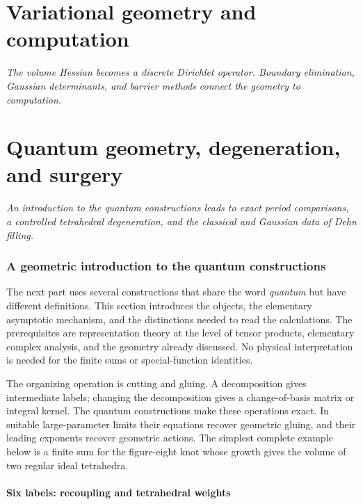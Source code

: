 \documentclass[11pt,a4paper]{article}
\newcommand{\monographpart}[2]{%
  \clearpage\part{#1}%
  \noindent\textit{#2}\par\medskip}
\numberwithin{equation}{section}
\theoremstyle{definition}
\theoremstyle{remark}
\begin{document}
\monographpart{Variational geometry and computation}{The volume Hessian becomes a discrete Dirichlet operator. Boundary elimination, Gaussian determinants, and barrier methods connect the geometry to computation.}


\monographpart{Quantum geometry, degeneration, and surgery}{An introduction to the quantum constructions leads to exact period comparisons, a controlled tetrahedral degeneration, and the classical and Gaussian data of Dehn filling.}

\section{A geometric introduction to the quantum constructions}
\label{sec:quantumintro}

The next part uses several constructions that share the word
\emph{quantum} but have different definitions. This section introduces
the objects, the elementary asymptotic mechanism, and the distinctions
needed to read the calculations. The prerequisites are representation
theory at the level of tensor products, elementary complex analysis,
and the geometry already discussed. No physical interpretation is
needed for the finite sums or special-function identities.

The organizing operation is cutting and gluing. A decomposition gives
intermediate labels; changing the decomposition gives a change-of-basis
matrix or integral kernel. The quantum constructions make these
operations exact. In suitable large-parameter limits their equations
recover geometric gluing, and their leading exponents recover geometric
actions. The simplest complete example below is a finite sum for the
figure-eight knot whose growth gives the volume of two regular ideal
tetrahedra.

\subsection{Six labels: recoupling and tetrahedral weights}
\label{sec:introrecoupling}
\end{document}
